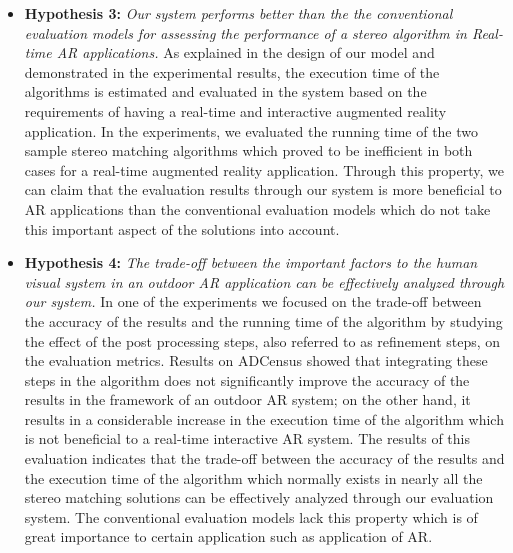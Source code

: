 \begin{itemize}
\item \textbf{Hypothesis 3:} \emph{Our system performs better than the the conventional evaluation models for assessing the performance of a stereo algorithm in
Real-time AR applications.}
As explained in the design of our model and demonstrated in the experimental results, the execution time of the algorithms 
is estimated and evaluated in the system based on the requirements of having a real-time and interactive augmented reality application.
In the experiments, we evaluated the running time of the two sample stereo matching algorithms which proved to be inefficient in both cases for 
a real-time augmented reality application. Through this property, we can claim that the evaluation results through our system is more beneficial to AR applications
than the conventional evaluation models which do not take this important aspect of the solutions into account.

\item \textbf{Hypothesis 4:} \emph{The trade-off between the important factors to the human visual system in an outdoor AR application 
can be effectively analyzed through our system.} 
In one of the experiments we focused on the trade-off between the accuracy of the results and the running time of the algorithm by studying the effect
of the post processing steps, also referred to as refinement steps, on the evaluation metrics. Results on ADCensus showed that integrating these steps in the algorithm
does not significantly improve the accuracy of the results in the framework of an outdoor AR system; on the other hand, it results in a considerable increase in the execution
time of the algorithm which is not beneficial to a real-time interactive AR system. The results of this evaluation indicates that the trade-off between the accuracy 
of the results and the execution time of the algorithm which normally exists in nearly all the stereo matching solutions can be effectively analyzed 
through our evaluation system. The conventional evaluation models lack this property which is of great importance to certain application such as application of AR.

\end{itemize}



